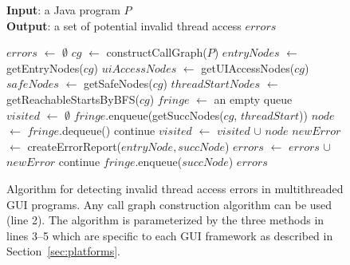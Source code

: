 \begin{figure}[t]
\textbf{Input}: a Java program $\mathit{P}$\\
\textbf{Output}: a set of potential invalid thread access $\mathit{errors}$\\
\vspace{-4mm}
\begin{algorithmic}[1]
\STATE $\mathit{errors}$ $\leftarrow$ $\emptyset$
\STATE $\mathit{cg}$ $\leftarrow$ constructCallGraph($\mathit{P}$)
\STATE $\mathit{entryNodes}$ $\leftarrow$ getEntryNodes($\mathit{cg}$)
\STATE $\mathit{uiAccessNodes}$ $\leftarrow$ getUIAccessNodes($\mathit{cg}$)
\STATE $\mathit{safeNodes}$ $\leftarrow$ getSafeNodes($\mathit{cg}$)
\STATE $\mathit{threadStartNodes}$ $\leftarrow$ getReachableStartsByBFS($\mathit{cg}$)
\STATE $\mathit{fringe}$ $\leftarrow$ an empty queue\\
\STATE $\mathit{visited}$ $\leftarrow$ $\emptyset$
\STATE $\mathit{fringe}$.enqueue(getSuccNodes($\mathit{cg}$, $\mathit{threadStart}$))
\STATE $\mathit{node}$ $\leftarrow$ $\mathit{fringe}$.dequeue()
\STATE continue
\ENDIF
\STATE $\mathit{visited}$ $\leftarrow$ $\mathit{visited}$ $\cup$ $\mathit{node}$
\STATE $\mathit{newError}$ $\leftarrow$ createErrorReport($\mathit{entryNode, succNode}$)
\STATE $\mathit{errors}$ $\leftarrow$ $\mathit{errors}$ $\cup$ $\mathit{newError}$
\STATE continue
\ELSE
\STATE $\mathit{fringe}$.enqueue($\mathit{succNode}$)
\ENDIF 
\ENDFOR
\ENDWHILE
\ENDFOR
\ENDFOR
\RETURN $errors$
\vspace{-2mm}
\end{algorithmic}
\caption{Algorithm for detecting invalid thread access errors in multithreaded GUI programs. 
Any call graph construction algorithm can be used (line 2). The algorithm
is parameterized by the three methods in lines 3--5 which are specific to each GUI framework
 as described in Section~\ref{sec:platforms}.
} \label{fig:detectalgorithm}
\end{figure}

